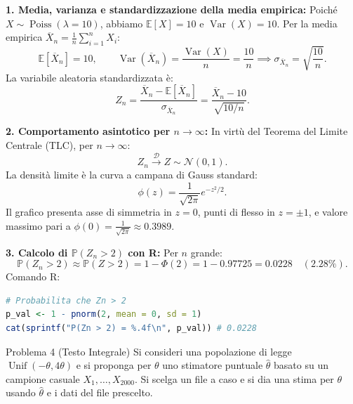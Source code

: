\documentclass[11pt,a4paper]{article}
\newcommand{\EE}{\mathbb{E}}
\newcommand{\Prob}{\mathbb{P}}
\newcommand{\Var}{\operatorname{Var}}
\begin{document}
\begin{soluzionebox}
\textbf{1. Media, varianza e standardizzazione della media empirica:}
Poiché $X \sim \operatorname{Poiss}(\lambda=10)$, abbiamo $\EE[X] = 10$ e $\Var(X) = 10$.
Per la media empirica $\overline{X}_n = \frac{1}{n}\sum_{i=1}^n X_i$:
\[
\EE[\overline{X}_n] = 10, \qquad \Var(\overline{X}_n) = \frac{\Var(X)}{n} = \frac{10}{n} \implies \sigma_{\overline{X}_n} = \sqrt{\frac{10}{n}}.
\]
La variabile aleatoria standardizzata è:
\[
Z_n = \frac{\overline{X}_n - \EE[\overline{X}_n]}{\sigma_{\overline{X}_n}} = \frac{\overline{X}_n - 10}{\sqrt{10/n}}.
\]

\textbf{2. Comportamento asintotico per $n \to \infty$:}
In virtù del Teorema del Limite Centrale (TLC), per $n \to \infty$:
\[
Z_n \xrightarrow{\mathcal{D}} Z \sim \mathcal{N}(0, 1).
\]
La densità limite è la curva a campana di Gauss standard:
\[
\phi(z) = \frac{1}{\sqrt{2\pi}} e^{-z^2/2}.
\]
Il grafico presenta asse di simmetria in $z = 0$, punti di flesso in $z = \pm 1$, e valore massimo pari a $\phi(0) = \frac{1}{\sqrt{2\pi}} \approx 0.3989$.

\textbf{3. Calcolo di $\Prob(Z_n > 2)$ con R:}
Per $n$ grande:
\[
\Prob(Z_n > 2) \approx \Prob(Z > 2) = 1 - \Phi(2) = 1 - 0.97725 = \bm{0.0228} \quad (\bm{2.28\%}).
\]
Comando R:
\begin{lstlisting}[language=R]
# Probabilita che Zn > 2
p_val <- 1 - pnorm(2, mean = 0, sd = 1)
cat(sprintf("P(Zn > 2) = %.4f\n", p_val)) # 0.0228
\end{lstlisting}
\end{soluzionebox}

\begin{problemabox}{Problema 4 (Testo Integrale)}
Si consideri una popolazione di legge $\operatorname{Unif}(-\theta, 4\theta)$ e si proponga per $\theta$ uno stimatore puntuale $\widehat{\theta}$ basato su un campione casuale $X_1, \dots, X_{2000}$.
Si scelga un file a caso e si dia una stima per $\theta$ usando $\widehat{\theta}$ e i dati del file prescelto.
\end{problemabox}
\end{document}
